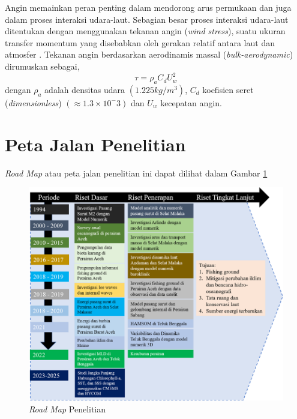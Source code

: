 \begin{spacing}{1.5}
	Angin memainkan peran penting dalam mendorong arus permukaan dan juga dalam proses interaksi udara-laut. Sebagian besar proses interaksi udara-laut ditentukan dengan menggunakan tekanan angin (\textit{wind stress}), suatu ukuran transfer momentum yang disebabkan oleh gerakan relatif antara laut dan atmosfer . Tekanan angin berdasarkan aerodinamis massal (\textit{bulk-aerodynamic}) dirumuskan sebagai,
	\begin{equation}
		\tau = \rho_a C_d U_w^2
	\end{equation}
	dengan $\rho_a$ adalah densitas udara $(1.225 kg/m^3)$, $C_d$ koefisien seret (\textit{dimensionless}) $(\approx 1.3 \times 10^-3)$ dan $U_w$ kecepatan angin.

	
\end{spacing}
\vspace{-1pc}
\section[Peta Jalan Penelitian]{Peta Jalan Penelitian}
\begin{spacing}{1.5}
	\textit{Road Map} atau peta jalan penelitian ini dapat dilihat dalam Gambar \ref{fig:RM}
	\begin{figure}[H]
		\centering
		\includegraphics[width=12cm]{contents/Figures/Road_Map}
		\caption{\textit{Road Map} Penelitian}
		\label{fig:RM}
	\end{figure}
	
\end{spacing}